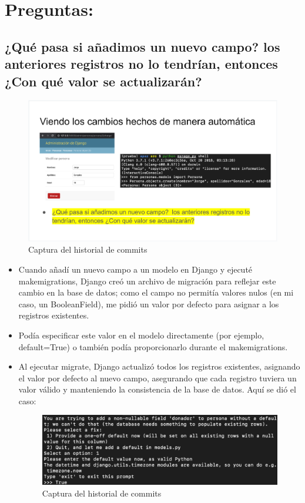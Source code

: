 \documentclass{article}
\begin{document}
    \section{Preguntas:}
        \subsection{¿Qué pasa si añadimos un nuevo campo?  los anteriores registros no lo tendrían, entonces ¿Con qué valor se actualizarán?}
        \begin{figure}[H]
            \centering
            \includegraphics[width=1\linewidth]{img/Pregunta1.png}
            \caption{Captura del historial de commits}
            \label{fig:enter-label}
        \end{figure}
        \begin{itemize}
            \item Cuando añadí un nuevo campo a un modelo en Django y ejecuté makemigrations, Django creó un archivo de migración para reflejar este cambio en la base de datos; como el campo no permitía valores nulos (en mi caso, un BooleanField), me pidió un valor por defecto para asignar a los registros existentes. 
            \item Podía especificar este valor en el modelo directamente (por ejemplo, default=True) o también podía proporcionarlo durante el makemigrations. 
            \item Al ejecutar migrate, Django actualizó todos los registros existentes, asignando el valor por defecto al nuevo campo, asegurando que cada registro tuviera un valor válido y manteniendo la consistencia de la base de datos. Aquí se dió el caso:
        \begin{figure}[H]
            \centering
            \includegraphics[width=0.8\linewidth]{img/DonadorDefault.png}
            \caption{Captura del historial de commits}
            \label{fig:enter-label}
        \end{figure}
        \end{itemize}
\end{document}
